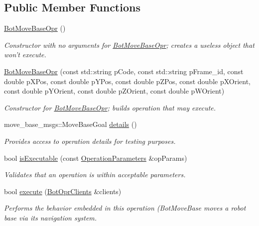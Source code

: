 \subsection*{Public Member Functions}
\begin{DoxyCompactItemize}
\item 
\hypertarget{classBotMoveBaseOpr_a777b4afcac42cfad28ece5d1962a50e8}{\hyperlink{classBotMoveBaseOpr_a777b4afcac42cfad28ece5d1962a50e8}{Bot\-Move\-Base\-Opr} ()}\label{classBotMoveBaseOpr_a777b4afcac42cfad28ece5d1962a50e8}

\begin{DoxyCompactList}\small\item\em Constructor with no arguments for \hyperlink{classBotMoveBaseOpr}{Bot\-Move\-Base\-Opr}; creates a useless object that won't execute. \end{DoxyCompactList}\item 
\hyperlink{classBotMoveBaseOpr_a269ba342770db907481955adb5bd9cec}{Bot\-Move\-Base\-Opr} (const std\-::string p\-Code, const std\-::string p\-Frame\-\_\-id, const double p\-X\-Pos, const double p\-Y\-Pos, const double p\-Z\-Pos, const double p\-X\-Orient, const double p\-Y\-Orient, const double p\-Z\-Orient, const double p\-W\-Orient)
\begin{DoxyCompactList}\small\item\em Constructor for \hyperlink{classBotMoveBaseOpr}{Bot\-Move\-Base\-Opr}; builds operation that may execute. \end{DoxyCompactList}\item 
move\-\_\-base\-\_\-msgs\-::\-Move\-Base\-Goal \hyperlink{classBotMoveBaseOpr_ad03fb9f3398b557549408752690e7d58}{details} ()
\begin{DoxyCompactList}\small\item\em Provides access to operation details for testing purposes. \end{DoxyCompactList}\item 
bool \hyperlink{classBotMoveBaseOpr_ae6a4ed7325d3bc728b6934250171178d}{is\-Executable} (const \hyperlink{classOperationParameters}{Operation\-Parameters} \&op\-Params)
\begin{DoxyCompactList}\small\item\em Validates that an operation is within acceptable parameters. \end{DoxyCompactList}\item 
bool \hyperlink{classBotMoveBaseOpr_aebac9f650a9960e132dccc61e54b8c93}{execute} (\hyperlink{classBotOprClients}{Bot\-Opr\-Clients} \&clients)
\begin{DoxyCompactList}\small\item\em Performs the behavior embedded in this operation (Bot\-Move\-Base moves a robot base via its navigation system. \end{DoxyCompactList}\end{DoxyCompactItemize}
